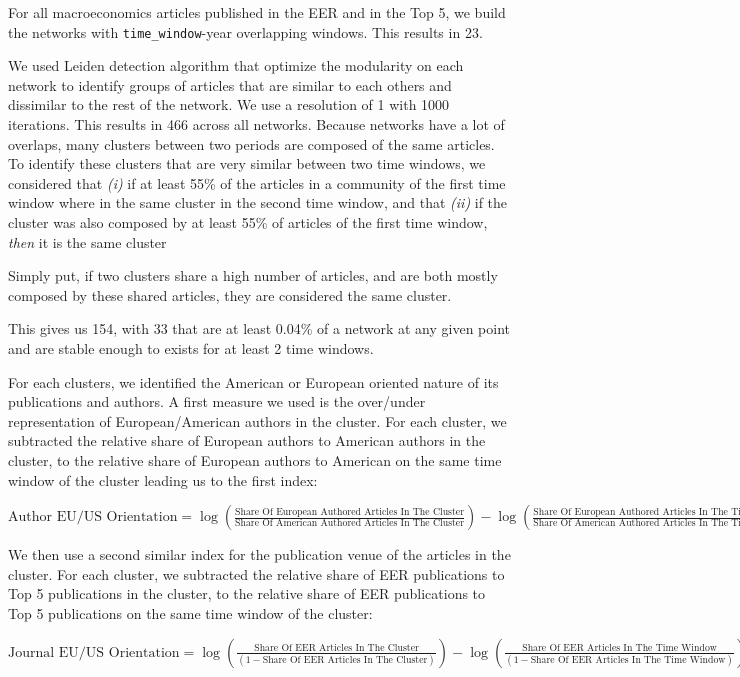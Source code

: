 \documentclass[]{elsarticle} %
\begin{document}
For all macroeconomics articles published in the EER and in the Top 5,
we build the networks with \texttt{time\_window}-year overlapping
windows. This results in 23.

We used Leiden detection algorithm \citep{traag2019} that optimize the
modularity on each network to identify groups of articles that are
similar to each others and dissimilar to the rest of the network. We use
a resolution of 1 with 1000 iterations. This results in 466 across all
networks. Because networks have a lot of overlaps, many clusters between
two periods are composed of the same articles. To identify these
clusters that are very similar between two time windows, we considered
that \emph{(i)} if at least 55\% of the articles in a community of the
first time window where in the same cluster in the second time window,
and that \emph{(ii)} if the cluster was also composed by at least 55\%
of articles of the first time window, \emph{then} it is the same cluster

Simply put, if two clusters share a high number of articles, and are
both mostly composed by these shared articles, they are considered the
same cluster.

This gives us 154, with 33 that are at least 0.04\% of a network at any
given point and are stable enough to exists for at least 2 time windows.

For each clusters, we identified the American or European oriented
nature of its publications and authors. A first measure we used is the
over/under representation of European/American authors in the cluster.
For each cluster, we subtracted the relative share of European authors
to American authors in the cluster, to the relative share of European
authors to American on the same time window of the cluster leading us to
the first index:

\(\text{Author EU/US Orientation}=\log(\frac{\text{Share Of European Authored Articles In The Cluster}}{\text{Share Of American Authored Articles In The Cluster}})-\log(\frac{\text{Share Of European Authored Articles In The Time Window}}{\text{Share Of American Authored Articles In The Time Window}})\)

We then use a second similar index for the publication venue of the
articles in the cluster. For each cluster, we subtracted the relative
share of EER publications to Top 5 publications in the cluster, to the
relative share of EER publications to Top 5 publications on the same
time window of the cluster:

\(\text{Journal EU/US Orientation}=\log(\frac{\text{Share Of EER Articles In The Cluster}}{(1-\text{Share Of EER Articles In The Cluster})})-\log(\frac{\text{Share Of EER Articles In The Time Window}}{(1-\text{Share Of EER Articles In The Time Window})})\)
\end{document}
